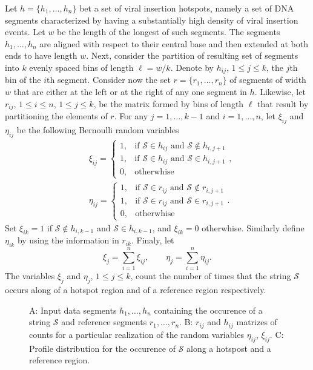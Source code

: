 \documentclass{bioinfo}
\begin{document}
Let $h = \{h_1, \ldots, h_n\}$ bet a set of viral insertion hotspots,
namely a set of DNA segments characterized by having a substantially
high density of viral insertion events. Let $w$ be the length of the
longest of such segments. The segments $h_1, \ldots, h_n$ are aligned
with respect to their central base and then extended at both ends to
have length $w$. Next, consider the partition of resulting set of
segments into $k$ evenly spaced bins of length $\ell = w/k$. Denote by
$h_{ij}$, $1 \leq j \leq k$, the $j$th bin of the $i$th
segment. Consider now the set $r= \{r_1, \ldots, r_n\}$ of segments of
width $w$ that are either at the left or at the right of any one
segment in $h$. Likewise, let $r_{ij}$, $1\leq i \leq n$, $1 \leq j
\leq k$, be the matrix formed by bins of length $\ell$ that result by
partitioning  the elements of $r$. For any $j = 1, \ldots, k-1$ and $i
= 1, \ldots, n$, let $\xi_{ij}$ and $\eta_{ij}$ be the following
Bernoulli random variables
\begin{align*}
   &\xi_{ij} = %
    \begin{cases}
     1, &\text{if } \mathcal S \in h_{ij} \text{ and } \mathcal S 
     \notin h_{i,j+1}\\
     1, &\text{if } \mathcal S \in h_{ij} \text{ and } \mathcal S 
     \in h_{i,j+1}\\
     0, &\text{otherwhise}
    \end{cases},\\
   &\eta_{ij} = %
    \begin{cases}
     1, &\text{if } \mathcal S \in r_{ij} \text{ and } \mathcal S 
     \notin r_{i,j+1}\\
     1, &\text{if } \mathcal S \in r_{ij} \text{ and } \mathcal S 
     \in r_{i,j+1}\\
     0, &\text{otherwhise}
    \end{cases}.
\end{align*}
Set $\xi_{ik}  = 1$ if $\mathcal S \notin h_{i,k-1}$ and $\mathcal S
\in h_{i,k-1}$, and $\xi_{ik} = 0$ otherwhise. Similarly define
$\eta_{ik}$ by using the information in $r_{ik}$. Finaly, let 
\[
   \xi_j = \sum_{i=1}^n \xi_{ij}, \qquad 
   \eta_j = \sum_{i=1}^n \eta_{ij}.
\]
The variables $\xi_j$ and $\eta_j$, $1 \leq j \leq k$, count the
number of times that the string $\mathcal S$ occurs along of a hotspot
region and of a reference region respectively.  


\begin{figure}
 
 \label{fig:methodscheme}
 \caption{A: Input data segments $h_1, \ldots, h_n$ containing the
   occurence of a string $\mathcal S$ and reference segments $r_1,
   \ldots, r_n$. B: $r_{ij}$ and $h_{ij}$ matrizes of counts for a
   particular realization of the random variables $\eta_{ij}$,
   $\xi_{ij}$. C: Profile distribution for the occurence of $\mathcal
   S$ along a hotspost and a reference region.} 
\end{figure}
\end{document}
